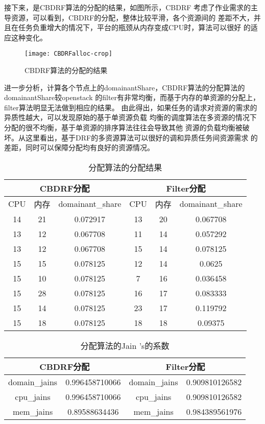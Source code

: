 接下来，是CBDRF算法的分配的结果，如图所示，CBDRF
考虑了作业需求的主导资源，可以看到，CBDRF的分配，整体比较平滑，各个资源间的
差距不大，并且在任务负重增大的情况下，平台的瓶颈从内存变成CPU时，算法可以很好
的适应这种变化。
\begin{figure}[htbp]
\centering\texttt{[image: CBDRFalloc-crop]}
\caption{CBDRF算法的分配的结果}\label{fig:CBDRFalloc}
\end{figure}


进一步分析，计算各个节点上的domainantShare，CBDRF算法的分配算法的domainantShare较openstack
的filter有非常均衡，而基于内存的单资源的分配上，filter算法明显无法做到相应的结果。
由此得出，如果任务的请求对资源的需求的异质性越大，可以发现原始的基于单资源负载
均衡的调度算法在多资源的情况下分配的很不均衡，基于单资源的排序算法往往会导致其他
资源的负载均衡被破坏。从这里看出，基于DRF的多资源算法可以很好的调和异质任务间资源需求
的差距，同时可以保障分配均有良好的资源情况。
\begin{table}[htp]
\caption{分配算法的分配结果}
\begin{center} 
\begin{tabular}{|c|c|c|c|c|c|}
\hline
\multicolumn{3}{|c|}{CBDRF分配} & \multicolumn{3}{|c|}{Filter分配} \\
\hline
CPU & 内存 & domainant\_share &CPU & 内存 & domainant\_share\\
\hline
14&21&0.072917&13&20&0.067708\\
\hline
13&12&0.067708&11&14&0.057292\\
\hline
13&12&0.067708&15&14&0.078125\\
\hline
15&15&0.078125&12&14&0.0625\\
\hline
15&10&0.078125&7&16&0.036458\\
\hline
15&28&0.078125&16&17&0.083333\\
\hline
15&14&0.078125&23&17&0.119792\\
\hline
15&18&0.078125&18&18&0.09375\\
\hline
\end{tabular}
\end{center}
\end{table}

\begin{table}[htp]
\caption{分配算法的Jain 's的系数}
\begin{center} 
\begin{tabular}{|c|c|c|c|}
\hline
\multicolumn{2}{|c|}{CBDRF分配} & \multicolumn{2}{|c|}{Filter分配} \\
\hline
domain\_jains& 0.996458710066&domain\_jains&0.909810126582\\
\hline 
cpu\_jains& 0.996458710066&cpu\_jains&0.909810126582\\
\hline
mem\_jains& 0.89588634436&mem\_jains&0.984389561976\\
\hline
\end{tabular}
\end{center}
\end{table}

